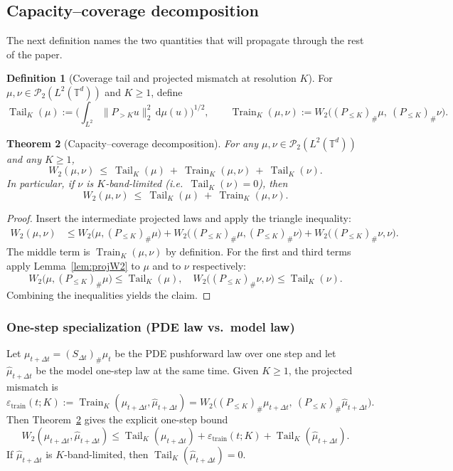 \documentclass{article}
\numberwithin{equation}{section}
\theoremstyle{plain}
\newtheorem{theorem}{Theorem}[section]
\theoremstyle{definition}
\newtheorem{definition}[theorem]{Definition}
\theoremstyle{remark}
\newcommand{\Tail}{\operatorname{Tail}}
\DeclareMathOperator{\Train}{Train}
\begin{document}
\subsection{Capacity--coverage decomposition}

The next definition names the two quantities that will propagate through the rest of the paper.

\begin{definition}[Coverage tail and projected mismatch at resolution $K$]
\label{def:cov-train-errors}
For $\mu,\nu\in\mathcal{P}_2(L^2(\mathbb{T}^d))$ and $K\ge 1$, define
\[
\Tail_K(\mu)
:=\Big(\int_{L^2}\|P_{>K}u\|_2^2\,\mathrm{d}\mu(u)\Big)^{1/2},
\qquad
\Train_K(\mu,\nu)
:= W_2\big((P_{\le K})_\#\mu,\ (P_{\le K})_\#\nu\big).
\]
\end{definition}

\begin{theorem}[Capacity--coverage decomposition]
\label{thm:cap-cov}
For any $\mu,\nu\in\mathcal{P}_2(L^2(\mathbb{T}^d))$ and any $K\ge 1$,
\[
W_2(\mu,\nu)\ \le\ \Tail_K(\mu)\ +\ \Train_K(\mu,\nu)\ +\ \Tail_K(\nu).
\]
In particular, if $\nu$ is $K$-band-limited (i.e.\ $\Tail_K(\nu)=0$), then
\[
W_2(\mu,\nu)\ \le\ \Tail_K(\mu)\ +\ \Train_K(\mu,\nu).
\]
\end{theorem}

\begin{proof}
Insert the intermediate projected laws and apply the triangle inequality:
\begin{align*}
W_2(\mu,\nu)
&\le W_2\big(\mu,(P_{\le K})_\#\mu\big)
   +W_2\big((P_{\le K})_\#\mu,(P_{\le K})_\#\nu\big)
   +W_2\big((P_{\le K})_\#\nu,\nu\big).
\end{align*}
The middle term is $\Train_K(\mu,\nu)$ by definition.
For the first and third terms apply Lemma~\ref{lem:projW2} to $\mu$ and to $\nu$ respectively:
\[
W_2\big(\mu,(P_{\le K})_\#\mu\big)\le \Tail_K(\mu),
\quad
W_2\big((P_{\le K})_\#\nu,\nu\big)\le \Tail_K(\nu).
\]
Combining the inequalities yields the claim.
\end{proof}

\subsubsection{One-step specialization (PDE law vs.\ model law)}
Let $\mu_{t+\Delta t}=(S_{\Delta t})_\#\mu_t$ be the PDE pushforward law over one step and
let $\widehat\mu_{t+\Delta t}$ be the model one-step law at the same time.
Given $K\ge 1$, the projected mismatch is
\[
\varepsilon_{\mathrm{train}}(t;K):=\Train_K(\mu_{t+\Delta t},\widehat\mu_{t+\Delta t})
= W_2\big((P_{\le K})_\#\mu_{t+\Delta t},\ (P_{\le K})_\#\widehat\mu_{t+\Delta t}\big).
\]
Then Theorem~\ref{thm:cap-cov} gives the explicit one-step bound
\begin{equation}\label{eq:onestep-cap-cov}
W_2(\mu_{t+\Delta t},\widehat\mu_{t+\Delta t})
\le
\Tail_K(\mu_{t+\Delta t})+\varepsilon_{\mathrm{train}}(t;K)+\Tail_K(\widehat\mu_{t+\Delta t}).
\end{equation}
If $\widehat\mu_{t+\Delta t}$ is $K$-band-limited, then $\Tail_K(\widehat\mu_{t+\Delta t})=0$.
\end{document}
